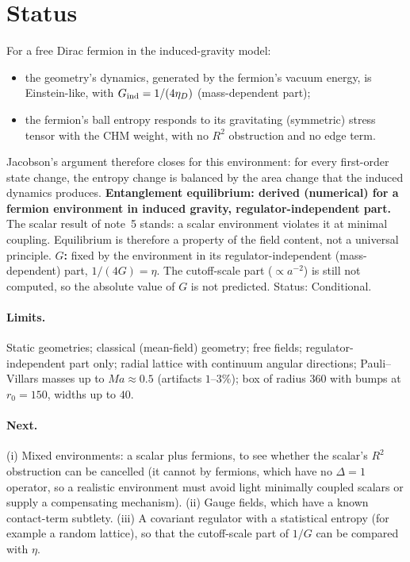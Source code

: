 \documentclass[11pt]{article}
\begin{document}
\section{Status}
For a free Dirac fermion in the induced-gravity model:
\begin{itemize}
\item the geometry's dynamics, generated by the fermion's vacuum energy, is Einstein-like, with $G_{\rm ind}=1/(4\eta_D)$ (mass-dependent part);
\item the fermion's ball entropy responds to its gravitating (symmetric) stress tensor with the CHM weight, with no $R^2$ obstruction and no edge term.
\end{itemize}
Jacobson's argument therefore closes for this environment: for every first-order state change, the entropy change is balanced by the area change that the induced dynamics produces. \textbf{Entanglement equilibrium: derived (numerical) for a fermion environment in induced gravity, regulator-independent part.} The scalar result of note~5 stands: a scalar environment violates it at minimal coupling. Equilibrium is therefore a property of the field content, not a universal principle. \textbf{$G$:} fixed by the environment in its regulator-independent (mass-dependent) part, $1/(4G)=\eta$. The cutoff-scale part ($\propto a^{-2}$) is still not computed, so the absolute value of $G$ is not predicted. Status: Conditional.

\paragraph{Limits.} Static geometries; classical (mean-field) geometry; free fields; regulator-independent part only; radial lattice with continuum angular directions; Pauli--Villars masses up to $Ma\approx0.5$ (artifacts $1$--$3\%$); box of radius $360$ with bumps at $r_0=150$, widths up to $40$.

\paragraph{Next.} (i) Mixed environments: a scalar plus fermions, to see whether the scalar's $R^2$ obstruction can be cancelled (it cannot by fermions, which have no $\Delta=1$ operator, so a realistic environment must avoid light minimally coupled scalars or supply a compensating mechanism). (ii) Gauge fields, which have a known contact-term subtlety. (iii) A covariant regulator with a statistical entropy (for example a random lattice), so that the cutoff-scale part of $1/G$ can be compared with $\eta$.
\end{document}
